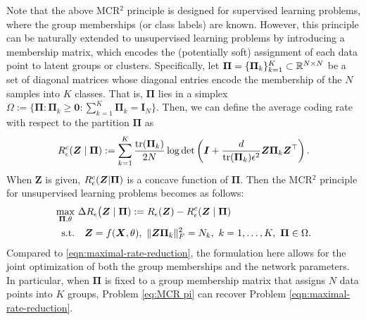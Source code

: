 \documentclass[../../book-main.tex]{subfiles}
\begin{document}
 
    Note that the above MCR$^2$  principle is designed for supervised learning problems, where the group memberships (or class labels) are known. However, this principle can be naturally extended to unsupervised learning problems by introducing a membership matrix, which encodes the (potentially soft) assignment of each data point to latent groups or clusters. Specifically, let $\bm \Pi = \{\bm \Pi_k\}_{k=1}^K \subset \mathbb{R}^{N\times N}$ be a set of diagonal matrices whose diagonal entries encode the membership of the $N$ samples into $K$ classes. That is, $\bm \Pi$ lies in a simplex $\Omega := \{\bm \Pi: \bm \Pi_k \ge \bm 0: \sum_{k=1}^K \bm \Pi_k = \bm I_N\}$. Then, we can define the average coding rate with respect to the partition $\bm \Pi$ as
    \begin{align}\label{eq:MCRc}
        R_{\epsilon}^c(\bm{Z} \mid \bm \Pi) := \sum_{k=1}^K \frac{\mathrm{tr}(\bm \Pi_k)}{2N}\log\det\left(\bm I + \frac{d}{\mathrm{tr}(\bm \Pi_k)\epsilon^2}\bm Z\bm \Pi_k \bm Z^\top \right).
    \end{align}
    When $\bm Z$ is given, $R_{\epsilon}^c(\bm{Z} \vert \bm \Pi)$ is a concave function of $\bm \Pi$. Then the MCR$^2$ principle for unsupervised learning problems becomes as follows:
    \begin{align}\label{eq:MCR pi}
        \max_{\bm \Pi, \theta} & \  \Delta R_{\epsilon}\big(\bm{Z}  \mid \bm \Pi) := R_{\epsilon}(\bm Z) - R_{\epsilon}^c(\bm{Z} \mid \bm \Pi) \notag \\ 
       \mathrm{s.t.}  & \ \ \ \bm Z = f(\bm X, \theta),\ \|\bm Z \bm \Pi_k\|_F^2 = N_k,\ k = 1,\dots,K,\ \bm\Pi \in \Omega. 
    \end{align}
    Compared to \eqref{eqn:maximal-rate-reduction}, the formulation here allows for the joint optimization of both the group memberships and the network parameters. In particular, when $\bm \Pi$ is fixed to a group membership matrix that assigns $N$ data points into $K$ groups, Problem \eqref{eq:MCR pi} can recover Problem \eqref{eqn:maximal-rate-reduction}.
 
\end{document}
